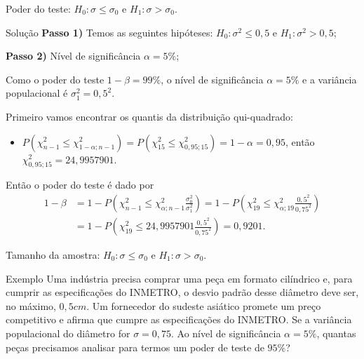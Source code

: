 \documentclass[8pt]{beamer}
\begin{document}
\begin{frame}{Poder do teste: $H_0: \sigma \leq \sigma_0$ e $H_1: \sigma > \sigma_0$.}

\begin{block}{Solução}
	\textbf{Passo 1)} Temos as seguintes hipóteses: $H_0: \sigma^2 \leq 0,5$ e $H_1: \sigma^2 > 0,5$;
	
	\textbf{Passo 2)} Nível de significância $\alpha = 5\%$;
	
	Como o poder do teste $1-\beta = 99\%$, o nível de significância $\alpha=5\%$ e a variância populacional é $\sigma_1^2 = 0,5^2$.
	
	Primeiro vamos encontrar os quantis da distribuição qui-quadrado:
	\begin{itemize}
		\item $P\left( \chi_{n-1}^2 \leq \chi_{1-\alpha; n-1}^2 \right) = P\left( \chi_{15}^2 \leq \chi_{0,95; 15}^2 \right) =1- \alpha = 0,95$, então $\chi_{0,95; 15}^2 = 24,9957901$.
	\end{itemize}
	
	Então o poder do teste é dado por
	\begin{align*}
	1-\beta &=1- P\left( \chi_{n-1}^2 \leq \chi_{\alpha; n-1}^2\frac{\sigma_0^2}{\sigma_1^2} \right) =1- P \left( \chi_{19}^2 \leq \chi_{\alpha; 19}^2\frac{0,5^2}{0,75^2} \right)\\ 
	&=1- P \left( \chi_{19}^2 \leq  24,9957901 \frac{0,5^2}{0,75^2} \right)= 0,9201.
	\end{align*}
\end{block}

\end{frame}


\begin{frame}{Tamanho da amostra: $H_0: \sigma \leq \sigma_0$ e $H_1: \sigma > \sigma_0$.}

\large

\begin{block}{Exemplo}
Uma indústria precisa comprar uma peça em formato cilíndrico e, para cumprir as especificações do INMETRO, o desvio padrão desse diâmetro deve ser, no máximo, $0,5cm$. Um fornecedor do sudeste asiático promete um preço competitivo e afirma que cumpre as especificações do INMETRO. Se a variância populacional do diâmetro for $\sigma=0,75$. Ao nível de significância $\alpha=5\%$, quantas peças precisamos analisar para termos um poder de teste de $95\%$?
\end{block}

\normalsize
\end{frame}
\end{document}
